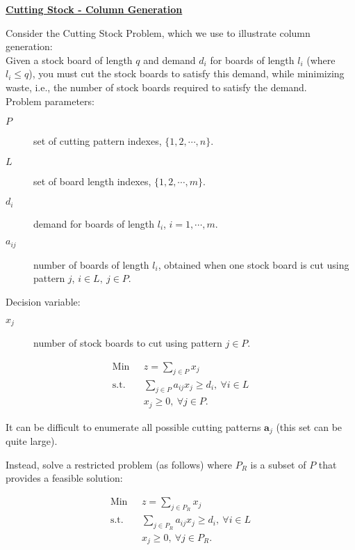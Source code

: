 %

\underline{\bf Cutting Stock - Column Generation}

Consider the Cutting Stock Problem, which we use to illustrate column generation: \\

Given a stock board of length $q$ and demand $d_i$ for boards of length $l_i$ (where $l_i \le q$), you must cut the stock boards to satisfy this demand, while minimizing waste, i.e., the number of stock boards required to satisfy the demand. \\

Problem parameters: 
\begin{description}
\item[$P$]  set of cutting pattern indexes, $\{1,2,\cdots,n\}$.
\item[$L$]  set of board length indexes, $\{1,2,\cdots,m\}$.
\item[$d_i$] demand for boards of length $l_i$, $i = 1,\cdots,m$. 
\item[$a_{ij}$] number of boards of length $l_i$, obtained when one stock board is cut using pattern $j$, $i \in L,~j \in P$.
\end{description}

Decision variable:
\begin{description}
\item[$x_j$] number of stock boards to cut using pattern $j \in P$.
\end{description}

\begin{align*}
\mbox{Min~~} & z = \sum_{j \in P} x_j \\
\mbox{s.t.~~} & \sum_{j \in P} a_{ij}x_j \ge d_i,~\forall i \in L \\
& x_j \ge 0,~\forall j \in P.
\end{align*}

It can be difficult to enumerate all possible cutting patterns $\mathbf{a}_j$ (this set can be quite large). 

Instead, solve a restricted problem (as follows) where $P_R$ is a subset of $P$ that provides a feasible solution:

\begin{align*}
\mbox{Min~~} & z = \sum_{j \in P_R} x_j \\
\mbox{s.t.~~} & \sum_{j \in P_R} a_{ij}x_j \ge d_i,~\forall i \in L \\
& x_j \ge 0,~\forall j \in P_R.
\end{align*}

